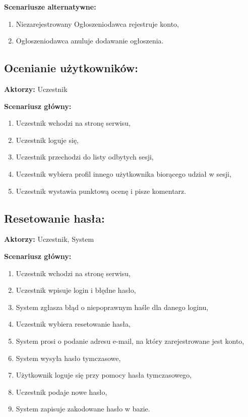 \textbf{Scenariusze alternatywne:}
	\begin{enumerate}
	\item Niezarejestrowany Ogłoszeniodawca rejestruje konto,
	\item Ogłoszeniodawca anuluje dodawanie ogłoszenia.
	\end{enumerate}

\subsection{Ocenianie użytkowników:}

\textbf{Aktorzy:} Uczestnik

\textbf{Scenariusz główny:}
	\begin{enumerate}
	\item Uczestnik wchodzi na stronę serwisu,
	\item Uczestnik loguje się,
	\item Uczestnik przechodzi do listy odbytych sesji,
	\item Uczestnik wybiera profil innego użytkownika biorącego udział w sesji,
	\item Uczestnik wystawia punktową ocenę i pisze komentarz.
	\end{enumerate}

\subsection{Resetowanie hasła:}

\textbf{Aktorzy:} Uczestnik, System

\textbf{Scenariusz główny:}
	\begin{enumerate}
	\item Uczestnik wchodzi na stronę serwisu,
	\item Uczestnik wpisuje login i błędne hasło,
	\item System zgłasza błąd o niepoprawnym haśle dla danego loginu,
	\item Uczestnik wybiera resetowanie hasła,
	\item System prosi o podanie adresu e-mail, na który zarejestrowane jest konto,
	\item System wysyła hasło tymczasowe,
	\item Użytkownik loguje się przy pomocy hasła tymczasowego,
	\item Uczestnik podaje nowe hasło,
	\item System zapisuje zakodowane hasło w bazie.
	\end{enumerate}

